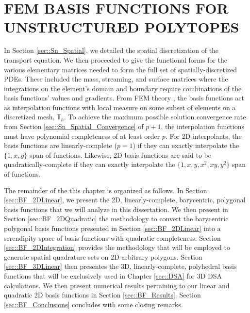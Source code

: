 %
%
%
\chapter{\uppercase {FEM Basis Functions for Unstructured Polytopes}}
\label{sec::BF}



In Section \ref{sec::Sn_Spatial}, we detailed the spatial discretization of the transport equation. We then proceeded to give the functional forms for the various elementary matrices needed to form the full set of spatially-discretized PDEs. These included the mass, streaming, and surface matrices where the integrations on the element's domain and boundary require combinations of the basis functions' values and gradients. From FEM theory \cite{ern2013theory}, the basis functions act as interpolation functions with local measure on some subset of elements on a discretized mesh, $\mathbb{T}_h$. To achieve the maximum possible solution convergence rate from Section \ref{sec::Sn_Spatial_Convergence} of $p+1$, the interpolation functions must have polynomial completeness of at least order $p$. For 2D interpolants, the basis functions are linearly-complete ($p=1$) if they can exactly interpolate the $\{ 1, x, y \}$ span of functions. Likewise, 2D basis functions are said to be quadratically-complete if they can exactly interpolate the $\{ 1, x, y, x^2, xy, y^2 \}$ span of functions.

The remainder of the this chapter is organized as follows. In Section \ref{sec::BF_2DLinear}, we present the 2D, linearly-complete, barycentric, polygonal basis functions that we will analyze in this dissertation. We then present in Section \ref{sec::BF_2DQuadratic} the methodology to convert the barycentric polygonal basis functions presented in Section \ref{sec::BF_2DLinear} into a serendipity space of basis functions with quadratic-completeness. Section \ref{sec::BF_2DIntegration} provides the methodology that will be employed to generate spatial quadrature sets on 2D arbitrary polygons. Section \ref{sec::BF_3DLinear} then presentes the 3D, linearly-complete, polyhedral basis functions that will be exclusively used in Chapter \ref{sec::DSA} for 3D DSA calculations. We then present numerical results pertaining to our linear and quadratic 2D basis functions in Section \ref{sec::BF_Results}. Section \ref{sec::BF_Conclusions} concludes with some closing remarks.

